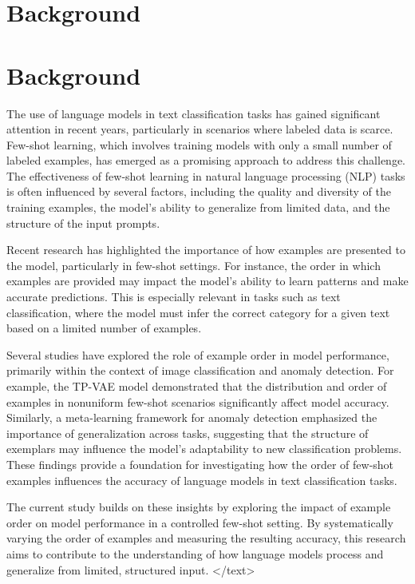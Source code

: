 \documentclass{article}
\begin{document}
\section{Background}
\section*{Background}

The use of language models in text classification tasks has gained significant attention in recent years, particularly in scenarios where labeled data is scarce. Few-shot learning, which involves training models with only a small number of labeled examples, has emerged as a promising approach to address this challenge. The effectiveness of few-shot learning in natural language processing (NLP) tasks is often influenced by several factors, including the quality and diversity of the training examples, the model's ability to generalize from limited data, and the structure of the input prompts. 

Recent research has highlighted the importance of how examples are presented to the model, particularly in few-shot settings. For instance, the order in which examples are provided may impact the model's ability to learn patterns and make accurate predictions. This is especially relevant in tasks such as text classification, where the model must infer the correct category for a given text based on a limited number of examples. 

Several studies have explored the role of example order in model performance, primarily within the context of image classification and anomaly detection. For example, the TP-VAE model \cite{2205.15014v1} demonstrated that the distribution and order of examples in nonuniform few-shot scenarios significantly affect model accuracy. Similarly, a meta-learning framework for anomaly detection \cite{2507.20019v1} emphasized the importance of generalization across tasks, suggesting that the structure of exemplars may influence the model's adaptability to new classification problems. These findings provide a foundation for investigating how the order of few-shot examples influences the accuracy of language models in text classification tasks. 

The current study builds on these insights by exploring the impact of example order on model performance in a controlled few-shot setting. By systematically varying the order of examples and measuring the resulting accuracy, this research aims to contribute to the understanding of how language models process and generalize from limited, structured input.
</text>
\end{document}
